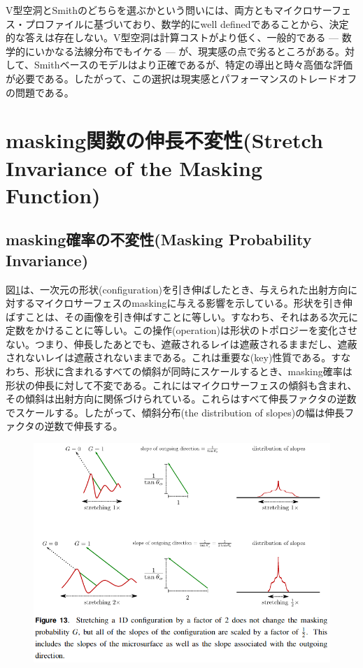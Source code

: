 \documentclass[a4j,xelatex,ja=standard]{bxjsarticle}
\begin{document}
V型空洞とSmithのどちらを選ぶかという問いには、両方ともマイクロサーフェス・プロファイルに基づいており、数学的にwell definedであることから、決定的な答えは存在しない。V型空洞は計算コストがより低く、一般的である --- 数学的にいかなる法線分布でもイケる --- が、現実感の点で劣るところがある。対して、Smithベースのモデルはより正確であるが、特定の導出と時々高価な評価が必要である。したがって、この選択は現実感とパフォーマンスのトレードオフの問題である。

\section{masking関数の伸長不変性(Stretch Invariance of the Masking Function)}
\label{sec:5}

\subsection{masking確率の不変性(Masking Probability Invariance)}

図\ref{fig:13}は、一次元の形状(configuration)を引き伸ばしたとき、与えられた出射方向に対するマイクロサーフェスのmaskingに与える影響を示している。形状を引き伸ばすことは、その画像を引き伸ばすことに等しい。すなわち、それはある次元に定数をかけることに等しい。この操作(operation)は形状のトポロジーを変化させない。つまり、伸長したあとでも、遮蔽されるレイは遮蔽されるままだし、遮蔽されないレイは遮蔽されないままである。これは重要な(key)性質である。すなわち、形状に含まれるすべての傾斜が同時にスケールするとき、masking確率は形状の伸長に対して不変である。これにはマイクロサーフェスの傾斜も含まれ、その傾斜は出射方向に関係づけられている。これらはすべて伸長ファクタの逆数でスケールする。したがって、傾斜分布(the distribution of slopes)の幅は伸長ファクタの逆数で伸長する。

\begin{figure}
    \includegraphics[width=\textwidth]{Figure13.png}
    \caption{}
    \label{fig:13}
\end{figure}
\end{document}
